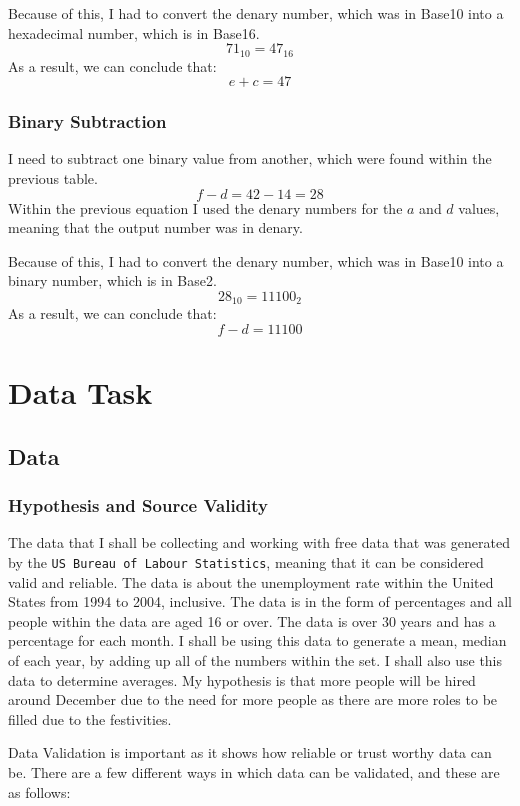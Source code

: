 \documentclass[a4paper,12pt]{article}
\begin{document}
    Because of this, I had to convert the denary number, which was in Base10 into a hexadecimal number, which is in Base16.
    \[
      71_{10} = 47_{16}
    \]
    As a result, we can conclude that:
    \[
      e + c = 47
    \]

  \subsubsection{Binary Subtraction}
    I need to subtract one binary value from another, which were found within the previous table.
    \[
      f - d = 42 - 14 = 28
    \]
    Within the previous equation I used the denary numbers for the $a$ and $d$ values, meaning that the output number was in denary.

    Because of this, I had to convert the denary number, which was in Base10 into a binary number, which is in Base2.
    \[
      28_{10} = 11100_{2}
    \]
    As a result, we can conclude that:
    \[
      f - d = 11100
    \]

\newpage

\section{Data Task}
  \subsection{Data}
    \subsubsection{Hypothesis and Source Validity}
      The data that I shall be collecting and working with free data that was generated by the \texttt{US Bureau of Labour Statistics}, meaning that it can be considered valid and reliable. The data is about the unemployment rate within the United States from 1994 to 2004, inclusive. The data is in the form of percentages and all people within the data are aged 16 or over.
      The data is over 30 years and has a percentage for each month. I shall be using this data to generate a mean, median of each year, by adding up all of the numbers within the set. I shall also use this data to determine averages.
      My hypothesis is that more people will be hired around December due to the need for more people as there are more roles to be filled due to the festivities.

      Data Validation is important as it shows how reliable or trust worthy data can be. There are a few different ways in which data can be validated, and these are as follows:
\end{document}
